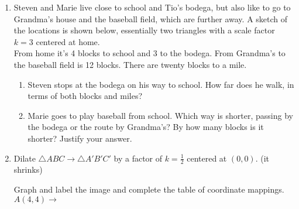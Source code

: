 \begin{enumerate}
\item Steven and Marie live close to school and Tio's bodega, but also like to go to Grandma's house and the baseball field, which are further away. A sketch of the locations is shown below, essentially two triangles with a scale factor $k=3$ centered at home.\\[0.25cm]
From home it's 4 blocks to school and 3 to the bodega. From Grandma's to the baseball field is 12 blocks. There are twenty blocks to a mile.
\begin{enumerate}
  \item Steven stops at the bodega on his way to school. How far does he walk, in terms of both blocks and miles?
\begin{flushright}
\end{flushright} 
  \item Marie goes to play baseball from school. Which way is shorter, passing by the bodega or the route by Grandma's? By how many blocks is it shorter? Justify your answer.
\end{enumerate}

\newpage
\item Dilate $\triangle ABC \rightarrow \triangle A'B'C'$ by a factor of $k=\frac{1}{2}$ centered at $(0,0)$. (it shrinks)
  \begin{multicols}{2}

    Graph and label the image and complete the table of coordinate mappings.\\[0.5cm]
    $A(4,4) \rightarrow $ \vspace{3cm}
  \end{multicols}


\end{enumerate}
